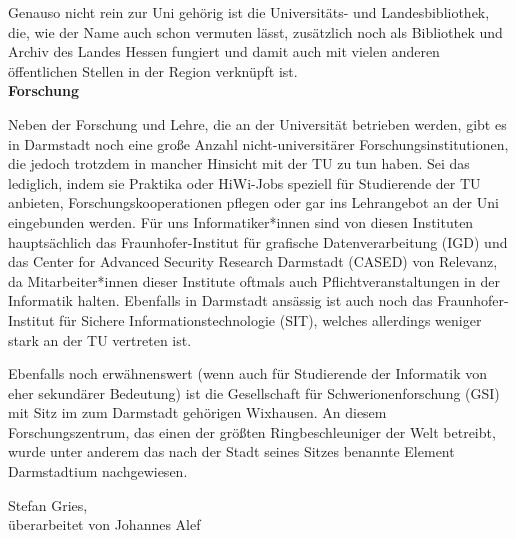 {Genauso nicht rein zur Uni gehörig ist die Universitäts- und Landesbibliothek, die, wie der Name auch schon vermuten lässt, zusätzlich noch als Bibliothek und Archiv des Landes Hessen fungiert und damit auch mit vielen anderen öffentlichen Stellen in der Region verknüpft ist.\\

\textbf{Forschung}

Neben der Forschung und Lehre, die an der Universität betrieben werden, gibt es in Darmstadt noch eine große Anzahl nicht-universitärer Forschungsinstitutionen, die jedoch trotzdem in mancher Hinsicht mit der TU zu tun haben. Sei das lediglich, indem sie Praktika oder HiWi-Jobs speziell für Studierende der TU anbieten, Forschungskooperationen pflegen oder gar ins Lehrangebot an der Uni eingebunden werden.
Für uns Informatiker*innen sind von diesen Instituten hauptsächlich das Fraunhofer-Institut für grafische Datenverarbeitung (IGD) und das Center for Advanced Security Research Darmstadt (CASED) von Relevanz, da Mitarbeiter*innen dieser Institute oftmals auch Pflichtveranstaltungen in der Informatik halten. Ebenfalls in Darmstadt ansässig ist auch noch das Fraunhofer-Institut für Sichere Informationstechnologie (SIT), welches allerdings weniger stark an der TU vertreten ist.

Ebenfalls noch erwähnenswert (wenn auch für Studierende der Informatik von eher sekundärer Bedeutung) ist die Gesellschaft für Schwerionenforschung (GSI) mit Sitz im zum Darmstadt gehörigen Wixhausen. An diesem Forschungszentrum, das einen der größten Ringbeschleuniger der Welt betreibt, wurde unter anderem das nach der Stadt seines Sitzes benannte Element Darmstadtium nachgewiesen.}
{Stefan Gries, \\überarbeitet von Johannes Alef}
\newpage
